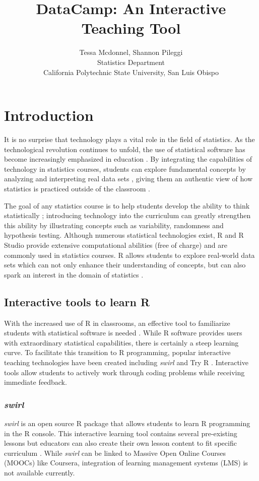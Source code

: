 \documentclass[12pt]{article}\usepackage[]{graphicx}\usepackage[]{color}
\title{DataCamp: An Interactive Teaching Tool}
\author{Tessa Mcdonnel, Shannon Pileggi \\Statistics Department \\ California Polytechnic State University, San Luis Obispo}
\begin{document}
\maketitle

\section{Introduction}

\doublespacing

It is no surprise that technology plays a vital role in the field of statistics. As the technological revolution continues to
unfold, the use of statistical software has become increasingly emphasized in education \citep{AmericanStatisticalAssociation2016}. By integrating the
capabilities of technology in statistics courses, students can explore fundamental concepts by analyzing and
interpreting real data sets \citep{Chance2007, Hardin2015, Horton2014}, giving them an authentic view of how statistics is 
practiced outside of the
classroom \citep{Wang2017}.

The goal of any statistics course is to help students develop the ability to think statistically
\citep{AmericanStatisticalAssociation2016}; introducing technology into the curriculum can greatly strengthen this ability by illustrating concepts such as
variability, randomness and hypothesis testing. Although numerous statistical technologies exist, R and R Studio
provide extensive computational abilities (free of charge) and are commonly used in statistics courses. R
allows students to explore real-world data sets which can not only enhance their understanding of concepts, but can also spark
an interest in the domain of statistics \citep{Wang2017}.


\subsection{Interactive tools to learn R}
With the increased use of R in classrooms, an effective tool to familiarize students with statistical software is needed
\citep{Baumer2014}. While R software provides users with extraordinary statistical capabilities, there is certainly a steep learning curve. To facilitate
this transition to R programming, popular interactive teaching technologies have been created including \textit{swirl} \citep{Kross} and Try R \citep{TryR}. 
Interactive tools allow students to actively work through coding problems while receiving immediate feedback.

\subsubsection{\textit{swirl}}
\textit{swirl} \citep{Kross} is an
open source R package that allows students to learn R programming in the R console. This interactive learning tool
contains several pre-existing lessons but educators can also create their own
lesson content to fit specific curriculum \citep{Carchedi2014}.
While \textit{swirl} can be linked to Massive Open Online Courses (MOOCs) like Coursera, integration of learning management 
systems (LMS) is not available currently. 
\end{document}

